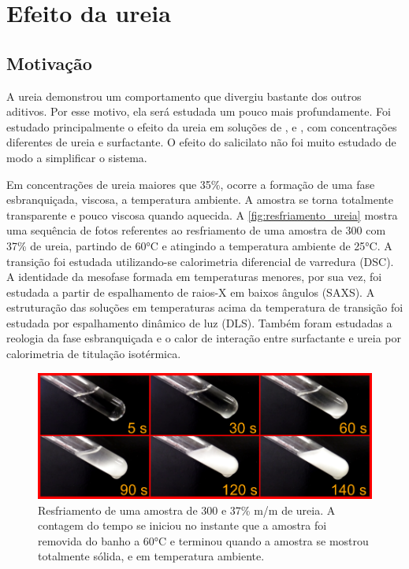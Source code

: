 \chapter{Efeito da ureia}
\label{sec:cap_efeito_ureia}

\section{Motivação}
A ureia demonstrou um comportamento que divergiu bastante dos outros aditivos. Por esse motivo, ela será estudada um pouco mais profundamente. Foi estudado principalmente o efeito da ureia em soluções de \CTAB{}, \TTAB{} e \DTAB, com concentrações diferentes de ureia e surfactante. O efeito do salicilato não foi muito estudado de modo a simplificar o sistema.

Em concentrações de ureia maiores que 35\%, ocorre a formação de uma fase esbranquiçada, viscosa, a temperatura ambiente. A amostra se torna totalmente transparente e pouco viscosa quando aquecida. A \autoref{fig:resfriamento_ureia} mostra uma sequência de fotos referentes ao resfriamento de uma amostra de \CTAB{} 300 \mM{} com 37\% de ureia, partindo de 60°C e atingindo a temperatura ambiente de 25°C. A transição foi estudada utilizando-se calorimetria diferencial de varredura (DSC). A identidade da mesofase formada em temperaturas menores, por sua vez, foi estudada a partir de espalhamento de raios-X em baixos ângulos (SAXS). A estruturação das soluções em temperaturas acima da temperatura de transição foi estudada por espalhamento dinâmico de luz (DLS). Também foram estudadas a reologia da fase esbranquiçada e o calor de interação entre surfactante e ureia por calorimetria de titulação isotérmica.

\begin{figure}[h]
	\centering
	\includegraphics[width=\textwidth]{imagens/ureia/tempos}
	\caption{Resfriamento de uma amostra de \CTAB{} 300 \mM{} e 37\% m/m de ureia. A contagem do tempo se iniciou no instante que a amostra foi removida do banho a 60°C e terminou quando a amostra se mostrou totalmente sólida, e em temperatura ambiente.}
	\label{fig:resfriamento_ureia}
\end{figure} 


